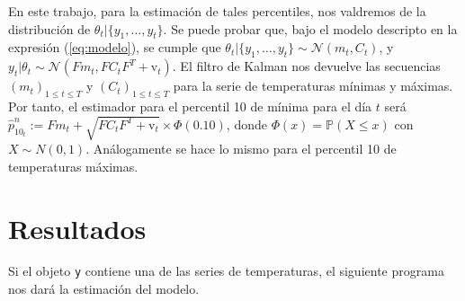 \documentclass[12pt]{article}\usepackage[]{graphicx}\usepackage[]{color}
\newcommand{\p}{\mathbb{P}}
\begin{document}
En este trabajo, para la estimación de tales percentiles, nos valdremos de la distribución de $\theta_t | \{y_1,\dots,y_t\}$. Se puede probar que, bajo el modelo descripto en la expresión (\ref{eq:modelo}), se cumple que $\theta_t | \{y_1,\dots,y_t\} \sim \mathcal{N}(m_t,C_t)$, y $y_t|\theta_t \sim \mathcal{N}(Fm_t,FC_tF^T + \text{v}_t)$. El filtro de Kalman nos devuelve las secuencias $(m_t)_{1\leq t \leq T}$ y $(C_t)_{1\leq t \leq T}$ para la serie de temperaturas mínimas y máximas. Por tanto, el estimador para el percentil 10 de mínima para el día $t$ será $\hat{p}^n_{10_t}:=Fm_t+\sqrt{FC_tF^T + \text{v}_t}\times \Phi(0.10)$, donde $\Phi(x)=\p(X\leq x)$ con $X\sim N(0,1)$. Análogamente se hace lo mismo para el percentil 10 de temperaturas máximas.

\section{Resultados}


Si el objeto \verb|y| contiene una de las series de temperaturas, el siguiente programa nos dará la estimación del modelo.
\end{document}

